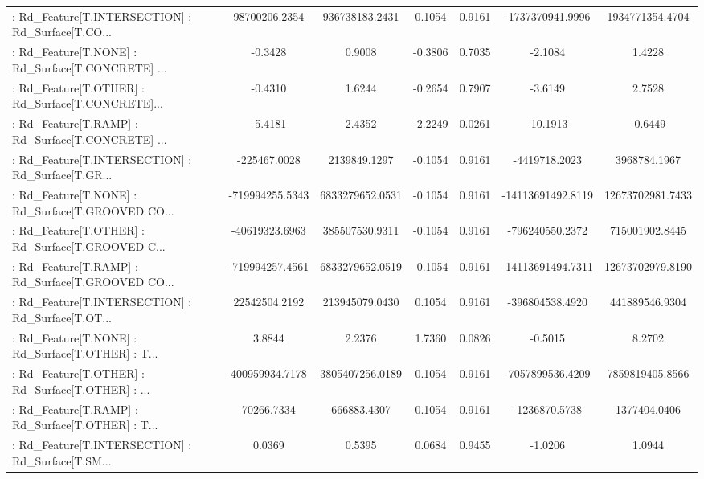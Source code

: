 \begin{longtable}{p{4cm}cccccc}
 : Rd\_Feature[T.INTERSECTION] : Rd\_Surface[T.CO... &     98700206.2354 &    936738183.2431 &  0.1054 &       0.9161 &   -1737370941.9996 &   1934771354.4704 \\
 : Rd\_Feature[T.NONE] : Rd\_Surface[T.CONCRETE] ... &           -0.3428 &            0.9008 & -0.3806 &       0.7035 &            -2.1084 &            1.4228 \\
 : Rd\_Feature[T.OTHER] : Rd\_Surface[T.CONCRETE]... &           -0.4310 &            1.6244 & -0.2654 &       0.7907 &            -3.6149 &            2.7528 \\
 : Rd\_Feature[T.RAMP] : Rd\_Surface[T.CONCRETE] ... &           -5.4181 &            2.4352 & -2.2249 &       0.0261 &           -10.1913 &           -0.6449 \\
 : Rd\_Feature[T.INTERSECTION] : Rd\_Surface[T.GR... &      -225467.0028 &      2139849.1297 & -0.1054 &       0.9161 &      -4419718.2023 &      3968784.1967 \\
 : Rd\_Feature[T.NONE] : Rd\_Surface[T.GROOVED CO... &   -719994255.5343 &   6833279652.0531 & -0.1054 &       0.9161 &  -14113691492.8119 &  12673702981.7433 \\
 : Rd\_Feature[T.OTHER] : Rd\_Surface[T.GROOVED C... &    -40619323.6963 &    385507530.9311 & -0.1054 &       0.9161 &    -796240550.2372 &    715001902.8445 \\
 : Rd\_Feature[T.RAMP] : Rd\_Surface[T.GROOVED CO... &   -719994257.4561 &   6833279652.0519 & -0.1054 &       0.9161 &  -14113691494.7311 &  12673702979.8190 \\
 : Rd\_Feature[T.INTERSECTION] : Rd\_Surface[T.OT... &     22542504.2192 &    213945079.0430 &  0.1054 &       0.9161 &    -396804538.4920 &    441889546.9304 \\
 : Rd\_Feature[T.NONE] : Rd\_Surface[T.OTHER] : T... &            3.8844 &            2.2376 &  1.7360 &       0.0826 &            -0.5015 &            8.2702 \\
 : Rd\_Feature[T.OTHER] : Rd\_Surface[T.OTHER] : ... &    400959934.7178 &   3805407256.0189 &  0.1054 &       0.9161 &   -7057899536.4209 &   7859819405.8566 \\
 : Rd\_Feature[T.RAMP] : Rd\_Surface[T.OTHER] : T... &        70266.7334 &       666883.4307 &  0.1054 &       0.9161 &      -1236870.5738 &      1377404.0406 \\
 : Rd\_Feature[T.INTERSECTION] : Rd\_Surface[T.SM... &            0.0369 &            0.5395 &  0.0684 &       0.9455 &            -1.0206 &            1.0944 \\

\end{longtable}
